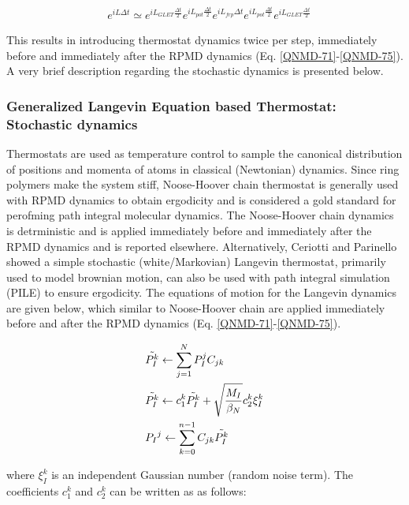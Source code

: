 \begin{align}
\label{QNMD-666}
    &e^{iL\Delta t}\simeq  e^{iL_{GLET}\frac{\Delta t}{2}} e^{iL_{pot}\frac{\Delta t}{2}}e^{iL_{frp}\Delta t}e^{iL_{pot}\frac{\Delta t}{2}} e^{iL_{GLET}\frac{\Delta t}{2}}
\end{align}

\noindent This results in introducing thermostat dynamics twice per step, immediately before and immediately after the RPMD dynamics (Eq. \ref{QNMD-71}-\ref{QNMD-75}). A very brief description regarding the stochastic dynamics is presented below. 

\subsubsection{Generalized Langevin Equation based Thermostat: Stochastic dynamics}

Thermostats are used as temperature control to sample the canonical distribution of positions and momenta of atoms in classical (Newtonian) dynamics. Since ring polymers make the system stiff, Noose-Hoover chain thermostat\cite{martyna1992nose,tuckerman1993efficient} is generally used with RPMD dynamics to obtain ergodicity and is considered a gold standard for perofming path integral molecular dynamics. The Noose-Hoover chain dynamics is detrministic and is applied immediately before and immediately after the RPMD dynamics and is reported elsewhere\cite{ceriotti2010efficient}. Alternatively, Ceriotti and Parinello\cite{ceriotti2010efficient} showed a simple stochastic (white/Markovian) Langevin thermostat, primarily used to model brownian motion, can also be used with path integral simulation (PILE) to ensure ergodicity. The equations of motion for the Langevin dynamics are given below, which similar to Noose-Hoover chain are applied immediately before and after the RPMD dynamics (Eq. \ref{QNMD-71}-\ref{QNMD-75}). 

\begin{align}
    \label{QNMD-91}
     &\Tilde{P_I^{k}} \leftarrow \sum_{j=1}^{N}P_I^{j}C_{jk}\notag\\
      &\Tilde{P_I^{k}} \leftarrow c_1^{k}\Tilde{P_I^{k}} + \sqrt{\frac{M_I}{\beta_N}}c_2^{k}\xi_I^{k}\notag\\ 
      &{P_I}^{j} \leftarrow \sum_{k=0}^{n-1} C_{jk} \Tilde{P_I^{k}}
\end{align}

\noindent where $\xi_I^{k}$ is an independent Gaussian number (random noise term). The coefficients $c_1^{k}$ and $c_2^{k}$ can be written as as follows:

